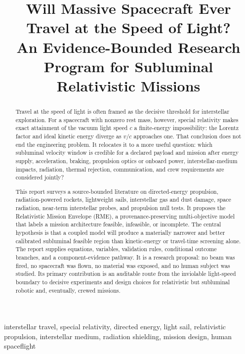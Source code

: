 \documentclass[conference]{../../../../Conference-LaTeX-template_10-17-19/IEEEtran}
\title{Will Massive Spacecraft Ever Travel at the Speed of Light?\\
An Evidence-Bounded Research Program for Subluminal Relativistic Missions}
\author{\IEEEauthorblockN{Research Proposal}
\IEEEauthorblockA{Four-agent evidence synthesis -- physics, systems engineering, and human-operation design only}}
\begin{document}
\maketitle

\begin{abstract}
Travel at the speed of light is often framed as the decisive threshold for interstellar exploration. For a spacecraft with nonzero rest mass, however, special relativity makes exact attainment of the vacuum light speed $c$ a finite-energy impossibility: the Lorentz factor and ideal kinetic energy diverge as $v/c$ approaches one. That conclusion does not end the engineering problem. It relocates it to a more useful question: which subluminal velocity window is credible for a declared payload and mission after energy supply, acceleration, braking, propulsion optics or onboard power, interstellar-medium impacts, radiation, thermal rejection, communication, and crew requirements are considered jointly?

This report surveys a source-bounded literature on directed-energy propulsion, radiation-powered rockets, lightweight sails, interstellar gas and dust damage, space radiation, near-term interstellar probes, and propulsion null tests. It proposes the Relativistic Mission Envelope (RME), a provenance-preserving multi-objective model that labels a mission architecture feasible, infeasible, or incomplete. The central hypothesis is that a coupled model will produce a materially narrower and better calibrated subluminal feasible region than kinetic-energy or travel-time screening alone. The report supplies equations, variables, validation rules, conditional outcome branches, and a component-evidence pathway. It is a research proposal: no beam was fired, no spacecraft was flown, no material was exposed, and no human subject was studied. Its primary contribution is an auditable route from the inviolable light-speed boundary to decisive experiments and design choices for relativistic but subluminal robotic and, eventually, crewed missions.
\end{abstract}

\begin{IEEEkeywords}
interstellar travel, special relativity, directed energy, light sail, relativistic propulsion, interstellar medium, radiation shielding, mission design, human spaceflight
\end{IEEEkeywords}
\end{document}
